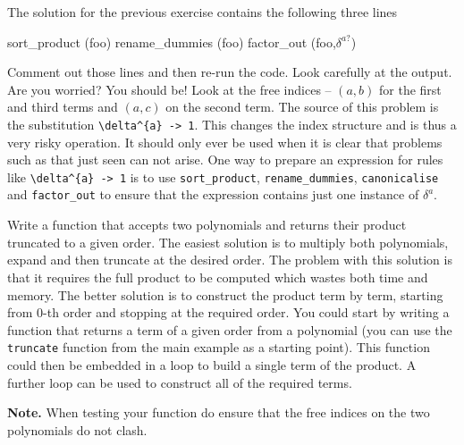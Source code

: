 \documentclass[a4paper,12pt]{article}
\numberwithin{equation}{section}%
\begin{document}
\begin{Exercises}
   \begin{Exercise}
      The solution for the previous exercise contains the following three lines
      \begin{cadabra}
         sort_product   (foo)
         rename_dummies (foo)
         factor_out     (foo,$\delta^{a?}$)
      \end{cadabra}
      Comment out those lines and then re-run the code. Look carefully at the output. Are you
      worried? You should be! Look at the free indices -- $(a,b)$ for the first and third
      terms and $(a,c)$ on the second term. The source of this problem is the substitution
      \verb|\delta^{a} -> 1|. This changes the index structure and is thus a very risky
      operation. It should only ever be used when it is clear that problems such as that
      just seen can not arise. One way to prepare an expression for rules like
      \verb|\delta^{a} -> 1| is to use \verb|sort_product|, \verb|rename_dummies|,
      \verb|canonicalise| and \verb|factor_out| to ensure that the expression contains just
      one instance of $\delta^{a}$.
   \end{Exercise}

   \begin{Exercise}
      Write a function that accepts two polynomials and returns their product truncated to a
      given order. The easiest solution is to multiply both polynomials, expand and then
      truncate at the desired order. The problem with this solution is that it requires the
      full product to be computed which wastes both time and memory. The better solution is
      to construct the product term by term, starting from 0-th order and stopping at the
      required order. You could start by writing a function that returns a term of a given
      order from a polynomial (you can use the \verb|truncate| function from the main
      example as a starting point). This function could then be embedded in a loop to build
      a single term of the product. A further loop can be used to construct all of the
      required terms.

      {\bf Note.} When testing your function do ensure that the free indices on the two
      polynomials do not clash.
   \end{Exercise}


\end{Exercises}
\end{document}
